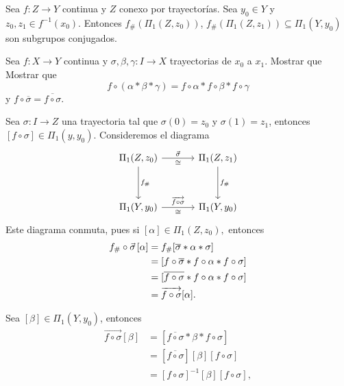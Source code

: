 \begin{prop}
    Sea $f:Z\to Y$ continua y $Z$ conexo por trayectorías. Sea $y_0\in Y$ y $z_0,z_1\in f^{-1}(x_0).$ Entonces $f_{\#}(\Pi_1(Z,z_0))$, $f_{\#}(\Pi_1(Z,z_1))\subseteq \Pi_1(Y,y_0)$ son subgrupos conjugados.
\end{prop}
\begin{ejercicio}
    Sea $f:X\to Y$ continua y $\sigma,\beta,\gamma:I\to X$ trayectorias de $x_0$ a $x_1$. Mostrar que
    Mostrar que 
    \begin{equation*}
        f\circ(\alpha*\beta*\gamma)=f\circ\alpha*f\circ\beta*f\circ\gamma
    \end{equation*}
    y $f\circ\overline{\sigma}=\overline{f\circ\sigma}$.
\end{ejercicio}
\begin{dem}
    Sea $\sigma:I\to Z$ una trayectoria tal que $\sigma(0)=z_0$ y $\sigma(1)=z_1$, entonces $[f\circ\sigma]\in\Pi_1(y,y_0)$. Consideremos el diagrama
    \begin{equation*}
        \begin{tikzcd}[column sep=1.2cm, row sep=1.2cm]
            \Pi_1(Z,z_0)\arrow["f_\#",d]\arrow[r,"\vec{\sigma}","\cong"'] & \Pi_1(Z,z_1)\arrow["f_\#",d]\\
            \Pi_1(Y,y_0)\arrow["\overrightarrow{f\circ\sigma}","\cong"',r] & \Pi_1(Y,y_0)
        \end{tikzcd}
    \end{equation*}
    Este diagrama conmuta, pues si $[\alpha]\in \Pi_1(Z,z_0),$ entonces
    \begin{align*}
        f_\#\circ\vec{\sigma}\hspace{0.5mm}[\alpha]&=f_\#[\overline{\sigma}*\alpha*\sigma]\\
        &=[f\circ\overline{\sigma}*f\circ\alpha*f\circ\sigma]\\
        &=[\overline{f\circ\sigma}*f\circ\alpha*f\circ\sigma]\\
        &=\overrightarrow{f\circ\sigma}[\alpha].
    \end{align*}
\end{dem}
Sea $[\beta]\in\Pi_1(Y,y_0)$, entonces 
\begin{align*}
    \overrightarrow{f\circ\sigma}[\beta]&=[\overline{f\circ\sigma}*\beta*f\circ\sigma]\\
    &=[\overline{f\circ\sigma}][\beta][f\circ\sigma]\\
    &=[f\circ\sigma]^{-1}[\beta][f\circ\sigma],
\end{align*}
